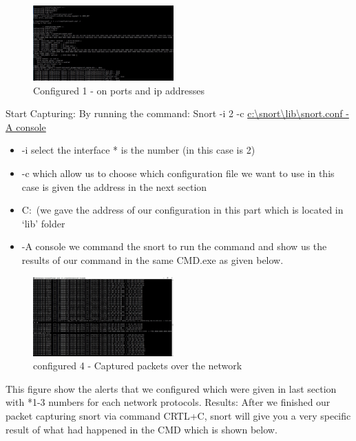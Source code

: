 \documentclass{article}
\begin{document}
\begin{figure}[H]
	\begin{center}
		\includegraphics[width=0.48\textwidth]{portip.jpg}
	\end{center}
	\caption{Configured 1 - on ports and ip addresses}
	\label{fig:Ipport }
\end{figure}


Start Capturing:
By running the command:
Snort -i 2 -c \url{c:\snort\lib\snort.conf -A console}

\begin{itemize}
	
	\item -i select the interface * is the number (in this case is  2)
	\item -c which allow us to choose which configuration file we want to use in this case is given the address in the next section
	\item C:\ (we gave the address of our configuration in this part which is located in ‘lib’ folder
	\item -A console we command the snort to run the command and show us the results of our command in the same CMD.exe as given below. 
\end{itemize}



 


\begin{figure}[H]
	\begin{center}
		\includegraphics[width=0.48\textwidth]{Conf4.jpg}
	\end{center}
	\caption{configured 4 - Captured packets over the network}
	\label{fig:Conf4}
\end{figure}


This figure show the alerts that we configured which were given in last section with *1-3 numbers for each network protocols.
Results:
After we finished our packet capturing snort via command CRTL+C, snort will give you a very specific result of what had happened in the CMD which is shown below.
\end{document}
